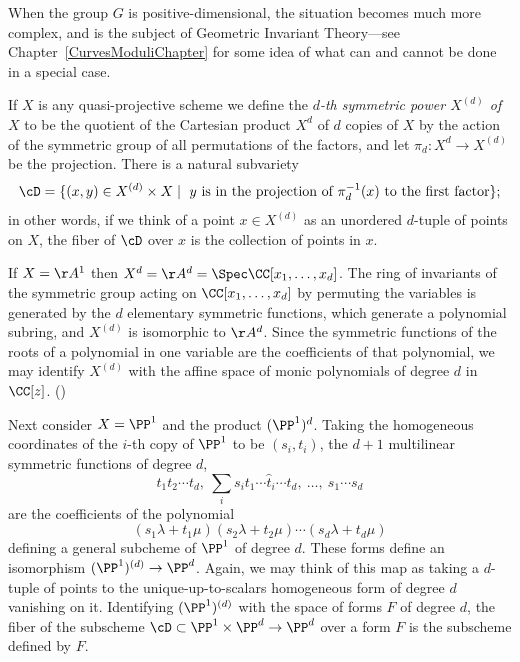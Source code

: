 When the group $G$ is positive-dimensional, the situation becomes much more complex, and is the subject
of Geometric Invariant Theory---see Chapter~\ref{CurvesModuliChapter} for some  idea of what can and cannot be done
in a special case.

If $X$ is any  quasi-projective scheme we define the \emph{$d$-th symmetric power $X^{(d)}$ of $X$} to be the quotient of the Cartesian product $X^d$ of $d$ copies of $X$ by the action of the symmetric group of all permutations of the factors, and let $\pi_d: X^d\to X^{(d)}$ be the projection. There is a natural
subvariety 
$$
\cD = \{(x,y) \in X^{(d)} \times X\mid \hbox{ $y$ is in the projection of $\pi_d^{-1}(x)$ to the first factor}\};
$$
in other words, if we think of a point $x \in X^{(d)}$ as an unordered $d$-tuple of points on $X$, the fiber of $\cD$ over $x$ is the collection of points in $x$.



If $X=\AA^{1}$ then $X^{d} = \AA^{d} = \Spec \CC[x_{1}, \dots, x_{d}]$. The ring of invariants of the symmetric group acting on
$\CC[x_{1}, \dots, x_{d}]$ by permuting the variables is generated by the $d$ elementary symmetric functions, which generate a polynomial subring, and $X^{(d)}$ is isomorphic to $\AA^{d}$. Since the symmetric functions of the roots of a polynomial in one variable are the coefficients of
that polynomial, we may identify $X^{(d)}$ with the affine space of monic polynomials of degree $d$ in $\CC[z]$. (\cite[Exercises 1.6, 13.2-13.4]{Eisenbud1995})

Next consider $X = \PP^1$ and the product $(\PP^1)^d$. Taking the homogeneous coordinates of the
$i$-th copy of $\PP^1$ to be $(s_i,t_i)$, the $d+1$ multilinear symmetric functions of degree $d$,
$$
t_1t_2\cdots t_d,\ \sum_i s_it_1\cdots\hat t_i\cdots t_d,\ \dots,\ s_1\cdots s_d
$$
are the coefficients of the polynomial
$$
(s_1\lambda + t_1\mu)(s_2\lambda + t_2\mu)\cdots(s_d\lambda + t_d\mu)
$$
defining a general subcheme of $\PP^1$ of degree $d$. These forms  define
an isomorphism $(\PP^1)^{(d)} \to \PP^d$. 
Again, we may think of this map as taking a $d$-tuple of points to the unique-up-to-scalars
homogeneous form of degree $d$ vanishing on it.
Identifying $(\PP^1)^{(d)}$ with the space of forms
$F$ of degree $d$, the fiber of the subscheme $\cD\subset \PP^1 \times \PP^d \to \PP^d$
over a form $F$ is the subscheme defined by $F$.

